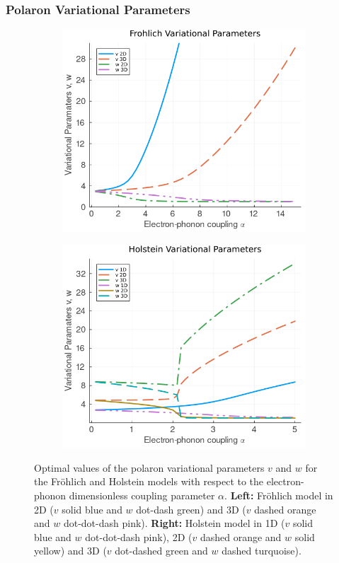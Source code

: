 \subsubsection{Polaron Variational Parameters}

\begin{figure}
  \begin{subfigure}[b]{0.49\textwidth}
    \includegraphics[width=\textwidth]{figures/vw_alpha_fro.png}
  \end{subfigure}
  \hfill
  \begin{subfigure}[b]{0.49\textwidth}
    \includegraphics[width=\textwidth]{figures/vw_alpha_hol.png}
  \end{subfigure}
  \caption{Optimal values of the polaron variational parameters $v$ and $w$ for the Fr\"ohlich and Holstein models with respect to the electron-phonon dimensionless coupling parameter $\alpha$. \textbf{Left:} Fr\"ohlich model in 2D ($v$ solid blue and $w$ dot-dash green) and 3D ($v$ dashed orange and $w$ dot-dot-dash pink). \textbf{Right:} Holstein model in 1D ($v$ solid blue and $w$ dot-dot-dash pink), 2D ($v$ dashed orange and $w$ solid yellow) and 3D ($v$ dot-dashed green and $w$ dashed turquoise).}
  \label{fig:vw_alpha}
\end{figure}

